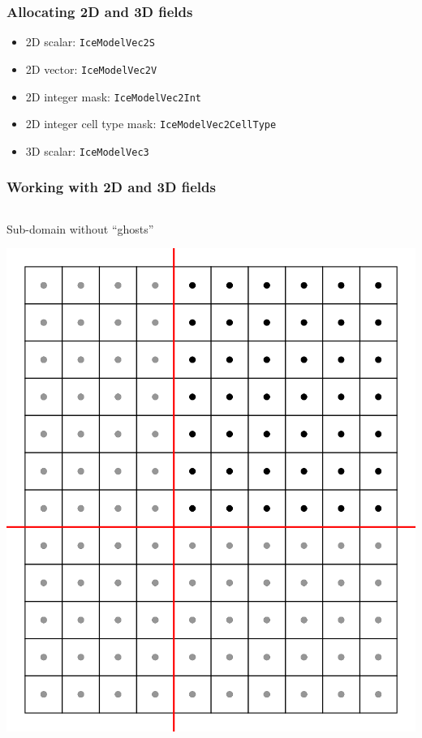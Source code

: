 \documentclass[hide notes,intlimits]{beamer}
\begin{document}
\begin{frame}
  \frametitle{Allocating 2D and 3D fields}

  \begin{itemize}
  \item 2D scalar: \texttt{IceModelVec2S}
  \item 2D vector: \texttt{IceModelVec2V}
  \item 2D integer mask: \texttt{IceModelVec2Int}
  \item 2D integer cell type mask: \texttt{IceModelVec2CellType}
  \item 3D scalar: \texttt{IceModelVec3}
  \end{itemize}

\end{frame}

\begin{frame}
  \frametitle{Working with 2D and 3D fields}

  \begin{columns}
    \begin{column}{0.5\linewidth}
    Sub-domain without ``ghosts''
    \begin{center}
      \includegraphics[width=0.75\linewidth]{grid-4}
    \end{center}
    \end{column}


\end{columns}
\end{frame}
\end{document}
